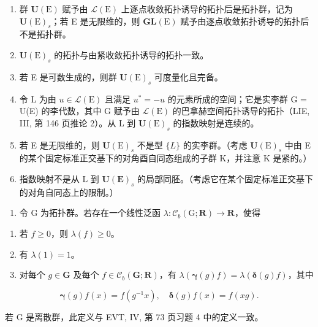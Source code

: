 \begin{enumerate}
\def\labelenumi{\alph{enumi})}
\item
  群 \(\mathbf{U}(\mathrm{E})\) 赋予由 \(\mathcal{L}(\mathrm{E})\) 上逐点收敛拓扑诱导的拓扑后是拓扑群，记为 \(\mathbf{U}(\mathrm{E})_{s}\)；若 E 是无限维的，则 \(\mathbf{GL}(\mathrm{E})\) 赋予由逐点收敛拓扑诱导的拓扑后不是拓扑群。
\item
  \(\mathbf{U}(\mathrm{E})_{s}\) 的拓扑与由紧收敛拓扑诱导的拓扑一致。
\item
  若 E 是可数生成的，则群 \(\mathbf{U}(\mathrm{E})_{s}\) 可度量化且完备。
\item
  令 L 为由 \(u \in \mathcal{L}(\mathrm{E})\) 且满足 \(u^{*} = -u\) 的元素所成的空间；它是实李群 G = U(E) 的李代数，其中 G 赋予由 \(\mathcal{L}(\mathrm{E})\) 的巴拿赫空间拓扑诱导的拓扑（LIE, III, 第 146 页推论 2）。从 L 到 \(\mathbf{U}(\mathrm{E})_s\) 的指数映射是连续的。
\item
  若 E 是无限维的，则 \(\mathbf{U}(\mathrm{E})_{s}\) 不是型 \(\{L\}\) 的实李群。（考虑 \(\mathbf{U}(\mathrm{E})_{s}\) 中由 E 的某个固定标准正交基下的对角酉自同态组成的子群 K，并注意 K 是紧的。）
\item
  指数映射不是从 L 到 \(\mathbf{U}(\mathbf{E})_{s}\) 的局部同胚。（考虑它在某个固定标准正交基下的对角自同态上的限制。）
\end{enumerate}

\begin{enumerate}
\def\labelenumi{\arabic{enumi})}
\setcounter{enumi}{3}
\tightlist
\item
  令 G 为拓扑群。若存在一个线性泛函 \(\lambda\colon\mathcal{C}_{b}(\mathrm{G};\mathbf{R})\to\mathbf{R}\)，使得
\end{enumerate}

\begin{enumerate}
\def\labelenumi{(\roman{enumi})}
\item
  若 \(f \geqslant 0\)，则 \(\lambda(f) \geqslant 0\)。
\item
  有 \(\lambda(1)=1\)。
\item
  对每个 \(g \in \mathbf{G}\) 及每个 \(f \in \mathcal{C}_b(\mathbf{G};\mathbf{R})\)，有 \(\lambda(\boldsymbol{\gamma}(g)f) = \lambda(\boldsymbol{\delta}(g)f)\)，其中
\end{enumerate}

\[
\boldsymbol {\gamma} (g) f (x) = f \left(g ^ {- 1} x\right), \quad \boldsymbol {\delta} (g) f (x) = f (x g).
\]

若 G 是离散群，此定义与 EVT, IV, 第 73 页习题 4 中的定义一致。

